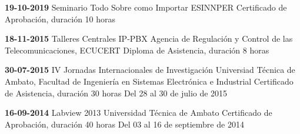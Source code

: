 \begin{levent}
    \cvevent
	{\textbf{19-10-2019}}
	{Seminario Todo Sobre como Importar}
	{ESINNPER}
	{Certificado de Aprobación, duración 10 horas}
	{}
\end{levent}

\begin{devent}
    \cvevent
	{\textbf{18-11-2015}}
	{Talleres Centrales IP-PBX}
	{Agencia de Regulación y Control de las Telecomunicaciones, ECUCERT}
	{Diploma de Asistencia, duración 8 horas}
	{}
\end{devent}

\begin{levent}
\cvevent
	{\textbf{30-07-2015}}
	{IV Jornadas Internacionales de Investigación}
	{Universiad Técnica de Ambato, Facultad de Ingeniería en Sistemas Electrónica e Industrial}
	{Certificado de Asistencia, duración 30 horas}
	{Del 28 al 30 de julio de 2015}
\end{levent}


\begin{devent}
    \cvevent
	{\textbf{16-09-2014}}
	{Labview 2013}
	{Universidad Técnica de Ambato}
	{Certificado de Aprobación, duración 40 horas}
	{Del 03 al 16 de septiembre de 2014}
\end{devent}

